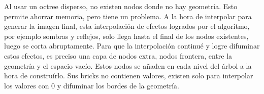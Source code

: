 Al usar un octree disperso, no existen nodos donde no hay geometría.
Esto permite ahorrar memoria, pero tiene un problema.
A la hora de interpolar para generar la imagen final, esta interpolación de efectos logrados por el algoritmo, por ejemplo sombras y reflejos, solo llega hasta el final de los nodos existentes, luego se corta abruptamente.
Para que la interpolación continué y logre difuminar estos efectos, es preciso una capa de nodos extra, nodos frontera, entre la geometría y el espacio vacío.
Estos nodos se añaden en cada nivel del árbol a la hora de construírlo.
Sus bricks no contienen valores, existen solo para interpolar los valores con 0 y difuminar los bordes de la geometría.






